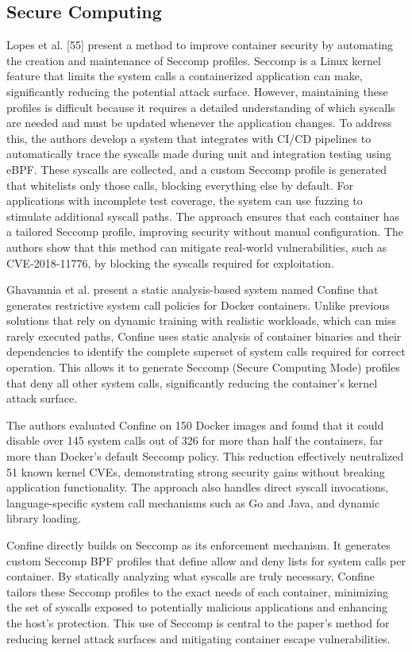\documentclass[12pt]{report}
\begin{document}
\begin{doublespace}
\subsection{Secure Computing}

Lopes et al. [55] present a method to improve container security by automating the creation and maintenance of Seccomp profiles. Seccomp is a Linux kernel feature that limits the system calls a containerized application can make, significantly reducing the potential attack surface. However, maintaining these profiles is difficult because it requires a detailed understanding of which syscalls are needed and must be updated whenever the application changes. To address this, the authors develop a system that integrates with CI/CD pipelines to automatically trace the syscalls made during unit and integration testing using eBPF. These syscalls are collected, and a custom Seccomp profile is generated that whitelists only those calls, blocking everything else by default. For applications with incomplete test coverage, the system can use fuzzing to stimulate additional syscall paths. The approach ensures that each container has a tailored Seccomp profile, improving security without manual configuration. The authors show that this method can mitigate real-world vulnerabilities, such as CVE-2018-11776, by blocking the syscalls required for exploitation.

Ghavamnia et al. present a static analysis-based system named Confine that generates restrictive system call policies for Docker containers. Unlike previous solutions that rely on dynamic training with realistic workloads, which can miss rarely executed paths, Confine uses static analysis of container binaries and their dependencies to identify the complete superset of system calls required for correct operation. This allows it to generate Seccomp (Secure Computing Mode) profiles that deny all other system calls, significantly reducing the container’s kernel attack surface.

The authors evaluated Confine on 150 Docker images and found that it could disable over 145 system calls out of 326 for more than half the containers, far more than Docker’s default Seccomp policy. This reduction effectively neutralized 51 known kernel CVEs, demonstrating strong security gains without breaking application functionality. The approach also handles direct syscall invocations, language-specific system call mechanisms such as Go and Java, and dynamic library loading.

Confine directly builds on Seccomp as its enforcement mechanism. It generates custom Seccomp BPF profiles that define allow and deny lists for system calls per container. By statically analyzing what syscalls are truly necessary, Confine tailors these Seccomp profiles to the exact needs of each container, minimizing the set of syscalls exposed to potentially malicious applications and enhancing the host’s protection. This use of Seccomp is central to the paper’s method for reducing kernel attack surfaces and mitigating container escape vulnerabilities.


\end{doublespace} 	\fontsize{12pt}{14pt} \selectfont
\end{document}
